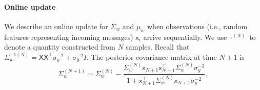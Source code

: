 \documentclass[english]{article}
\theoremstyle{plain}
\theoremstyle{plain}
\begin{document}
 
\paragraph{Online update}
We describe an online update for $\Sigma_{w}$ and
$\mu_{w}$ when observations (i.e., random features representing incoming 
messages) $\mathsf{x}_i$ arrive sequentially. We use $\cdot^{(N)}$
to denote a quantity constructed from $N$ samples. Recall that $\Sigma_{w}^{-1(N)}= \mathsf{X} \mathsf{X}^{\top}\sigma_{y}^{-2}+\sigma_{0}^{-2}I$.
The posterior covariance matrix at time $N+1$ is
\begin{equation}
\Sigma_{w}^{(N+1)} 
 =
\Sigma_{w}^{(N)}-\frac{\Sigma_{w}^{(N)} \mathsf{x}_{N+1} \mathsf{x}_{N+1}^{\top} \Sigma_{w}^{(N)}\sigma_{y}^{-2}}{1+ \mathsf{x}_{N+1}^{\top}\Sigma_{w}^{(N)} \mathsf{x}_{N+1}\sigma_{y}^{-2}},
\end{equation}
\end{document}
